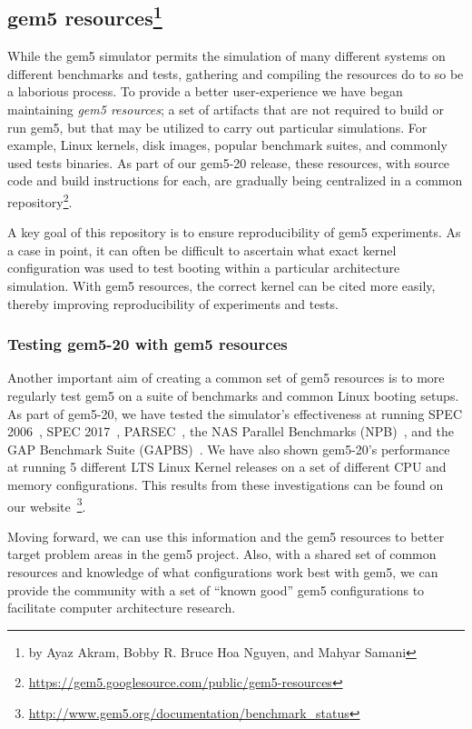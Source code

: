 \subsection[gem5 resources]{gem5 resources\footnote{by Ayaz Akram, Bobby R. Bruce Hoa Nguyen, and Mahyar Samani}}
\label{sec:resources}

While the gem5 simulator permits the simulation of many different systems on
different benchmarks and tests, gathering and compiling the resources do to so
be a laborious process. To provide
a better user-experience we have began maintaining \emph{gem5
resources}; a set of artifacts
that are not required to build or run gem5, but that may be utilized to carry out
particular simulations. For example, Linux kernels, disk images, popular
benchmark suites, and commonly used tests binaries. As part of our gem5-20
release, these resources, with source code and build instructions for each, are
gradually being centralized in a common repository\footnote{
\url{https://gem5.googlesource.com/public/gem5-resources}}.

A key goal of this repository is to ensure reproducibility of gem5
experiments. As a case in point, it can often be difficult to ascertain what exact
kernel configuration was used to test booting within a particular architecture
simulation. With gem5 resources, the correct kernel can be cited more easily,
thereby improving reproducibility of experiments and tests.

\subsubsection{Testing gem5-20 with gem5 resources}

Another important aim of creating a common set of gem5 resources is to more
regularly test gem5 on a suite of benchmarks and common Linux booting setups.
As part of gem5-20, we have tested the simulator's effectiveness
at running SPEC 2006~\cite{spec06}, SPEC 2017~\cite{spec17},
PARSEC~\cite{parsec}, the NAS Parallel Benchmarks (NPB)~\cite{npb},
and the GAP Benchmark Suite (GAPBS)~\cite{gapbs}. We have also shown gem5-20's
performance at running 5 different LTS Linux Kernel releases on a set of
different CPU and memory configurations. This results from these investigations
can be found on our website~\footnote{
\url{http://www.gem5.org/documentation/benchmark_status}}.

Moving forward, we can use this information and the gem5 resources to better target problem areas in the gem5 project.
Also, with a shared set of common resources and knowledge of what configurations work best with gem5, we can provide the community with a set of ``known good'' gem5 configurations to facilitate computer architecture research.


